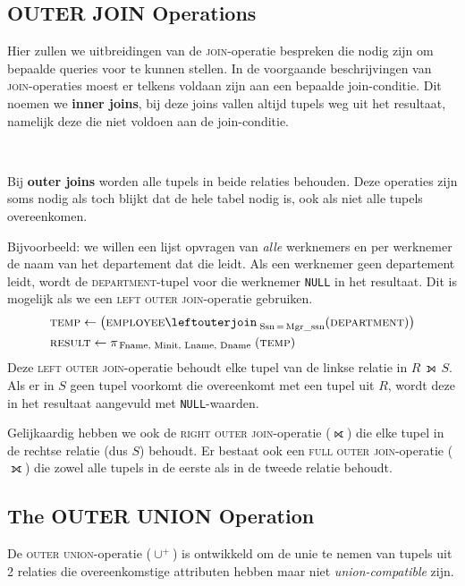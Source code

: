 \subsection{OUTER JOIN Operations}
Hier zullen we uitbreidingen van de \textsc{join}-operatie bespreken die nodig zijn om bepaalde queries voor te kunnen stellen. In de voorgaande beschrijvingen van \textsc{join}-operaties moest er telkens voldaan zijn aan een bepaalde join-conditie. Dit noemen we \textbf{inner joins}, bij deze joins vallen altijd tupels weg uit het resultaat, namelijk deze die niet voldoen aan de join-conditie.

~

\noindent Bij \textbf{outer joins} worden alle tupels in beide relaties behouden. Deze operaties zijn soms nodig als toch blijkt dat de hele tabel nodig is, ook als niet alle tupels overeenkomen.

Bijvoorbeeld: we willen een lijst opvragen van \textit{alle} werknemers en per werknemer de naam van het departement dat die leidt. Als een werknemer geen departement leidt, wordt de \textsc{department}-tupel voor die werknemer \texttt{NULL} in het resultaat. Dit is mogelijk als we een \textsc{left outer join}-operatie gebruiken.
\vspace{-2mm}
\begin{align*}
& \textsc{temp} \leftarrow \big( \textsc{employee} \leftouterjoin_{\;\text{Ssn} \,=\, \text{Mgr\_ssn}} (\textsc{department}) \big) \\
& \textsc{result} \leftarrow \pi_{\,\text{Fname, Minit, Lname, Dname}} \;(\textsc{temp})
\end{align*}
Deze \textsc{left outer join}-operatie behoudt elke tupel van de linkse relatie in $R \,\leftouterjoin\, S$. Als er in $S$ geen tupel voorkomt die overeenkomt met een tupel uit $R$, wordt deze in het resultaat aangevuld met \texttt{NULL}-waarden.

Gelijkaardig hebben we ook de \textsc{right outer join}-operatie ($\rightouterjoin$) die elke tupel in de rechtse relatie (dus $S$) behoudt. Er bestaat ook een \textsc{full outer join}-operatie ($\fullouterjoin$) die zowel alle tupels in de eerste als in de tweede relatie behoudt.


\subsection{The OUTER UNION Operation}
De \textsc{outer union}-operatie ($\cup^+$) is ontwikkeld om de unie te nemen van tupels uit 2 relaties die overeenkomstige attributen hebben maar niet \textit{union-compatible} zijn.

